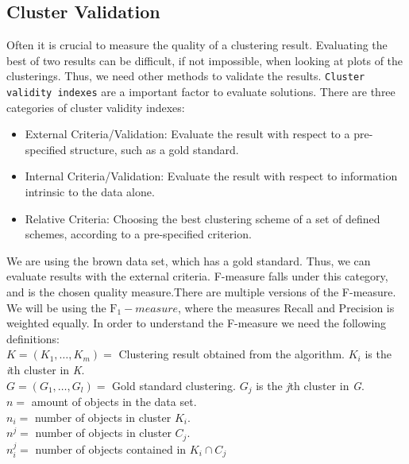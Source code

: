 \documentclass[a4paper,10pt]{article}
\theoremstyle{plain}
\theoremstyle{definition}
\begin{document}
\subsection{Cluster Validation}
Often it is crucial to measure the quality of a clustering result. Evaluating the best of two results can be difficult, if not impossible, when looking at plots of the clusterings. Thus, we need other methods to validate the results. \texttt{Cluster validity indexes} are a important factor to evaluate solutions. There are three categories of cluster validity indexes:
\begin{itemize}
	\item External Criteria/Validation: Evaluate the result with respect to a pre-specified structure, such as a gold standard. 
	\item Internal Criteria/Validation: Evaluate the result with respect to information intrinsic to the data alone.
	\item Relative Criteria: Choosing the best clustering scheme of a set of defined schemes, according to a pre-specified criterion.
\end{itemize}
We are using the brown data set, which has a gold standard. Thus, we can evaluate results with the external criteria. F-measure falls under this category, and is the chosen quality measure.There are multiple versions of the F-measure. We will be using the $\text{F}_1-measure$, where the measures Recall and Precision is weighted equally. In order to understand the F-measure we need the following definitions:\\
$K = (K_1, \dots, K_m) = $ Clustering result obtained from the algorithm. $K_i$ is the \textit{i}th cluster in \textit{K}.\\
$G = (G_1, \dots, G_l) = $ Gold standard clustering. $G_j$ is the \textit{j}th cluster in \textit{G}.\\
$n = $ amount of objects in the data set. \\
$n_i = $ number of objects in cluster $K_i$. \\
$n^j = $ number of objects in cluster $C_j$. \\
$n_{i}^{j} = $ number of objects contained in $K_i \cap C_j$
\end{document}
